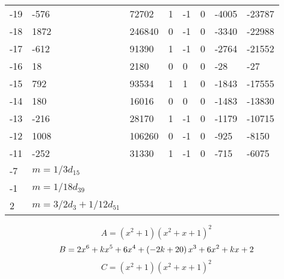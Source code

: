 \documentclass{amsart}
\begin{document}
\begin{longtable}{|l|l|l|lllll|}
-19&-576&72702&1&-1&0&-4005&-23787\\
-18&1872&246840&0&-1&0&-3340&-22988\\
-17&-612&91390&1&-1&0&-2764&-21552\\
-16&18&2180&0&0&0&-28&-27\\
-15&792&93534&1&1&0&-1843&-17555\\
-14&180&16016&0&0&0&-1483&-13830\\
-13&-216&28170&1&-1&0&-1179&-10715\\
-12&1008&106260&0&-1&0&-925&-8150\\
-11&-252&31330&1&-1&0&-715&-6075\\
-7&$m=1/3d_{15}$&&\multicolumn{5}{c|}{}\\
-1&$m=1/18d_{39}$&&\multicolumn{5}{c|}{}\\
2&$m=3/2d_{3}+1/12d_{51}$&&\multicolumn{5}{c|}{}\\
\hline
\end{longtable}
$$A=(x^2
 + 1)(x^2
 + x
 + 1)^{2}$$
$$B=2\*x^6
 + k\*x^5
 + 6\*x^4
 + \left(-2\*k
 + 20\right) \*x^3
 + 6\*x^2
 + k\*x
 + 2$$
$$C=(x^2
 + 1)(x^2
 + x
 + 1)^{2}$$
\end{document}
